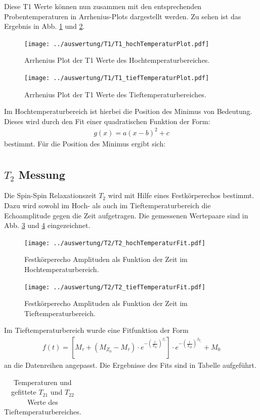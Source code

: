 Diese T1 Werte können nun zusammen mit den entsprechenden Probentemperaturen in Arrhenius-Plots dargestellt werden. Zu sehen ist das Ergebnis in Abb. \ref{pic_T1Arr_hoch} und \ref{pic_T1Arr_tief}.
\begin{figure}[htbp]
	\texttt{[image: ../auswertung/T1/T1\_hochTemperaturPlot.pdf]}
	\caption{Arrhenius Plot der T1 Werte des Hochtemperaturbereiches.}
	\label{pic_T1Arr_hoch}
\end{figure}
\begin{figure}[htbp]
	\texttt{[image: ../auswertung/T1/T1\_tiefTemperaturPlot.pdf]}
	\caption{Arrhenius Plot der T1 Werte des Tieftemperaturbereiches.}
	\label{pic_T1Arr_tief}
\end{figure}

Im Hochtemperaturbereich ist hierbei die Position des Minimus von Bedeutung. Dieses wird durch den Fit einer quadratischen Funktion der Form:
\begin{align}
	g(x) = a(x-b)^2+c
\end{align}
bestimmt. Für die Position des Minimus ergibt sich:
\begin{align*}
	
\end{align*}

\newpage
\subsection{$T_2$ Messung}
Die Spin-Spin Relaxationszeit $T_2$ wird mit Hilfe eines Festkörperechos bestimmt. Dazu wird sowohl im Hoch- als auch im Tieftemperaturbereich die Echoamplitude gegen die Zeit aufgetragen. Die gemessenen Wertepaare sind in Abb. \ref{pic_T2_hoch} und \ref{pic_T2_tief} eingezeichnet.
\begin{figure}[htbp]
	\texttt{[image: ../auswertung/T2/T2\_hochTemperaturFit.pdf]}
	\caption{Festkörperecho Amplituden als Funktion der Zeit im Hochtemperaturbereich.}
	\label{pic_T2_hoch}
\end{figure}
\begin{figure}[htbp]
	\texttt{[image: ../auswertung/T2/T2\_tiefTemperaturFit.pdf]}
	\caption{Festkörperecho Amplituden als Funktion der Zeit im Tieftemperaturbereich.}
	\label{pic_T2_tief}
\end{figure}

Im Tieftemperaturbereich wurde eine Fitfunktion der Form
\begin{align}
	f(t) = \left[ M_\tau+(M_{Z_0}-M_\tau)\cdot e^{-\left(\frac{t}{T_{21}}\right)^{\beta_\tau}} \right] \cdot e^{-\left(\frac{t}{T_{22}}\right)^{\beta_{T_1}}}+M_0
\end{align}
an die Datenreihen angepasst. Die Ergebnisse des Fits sind in Tabelle aufgeführt.
\begin{table}[htbp]
	\begin{tabular}{| >{$}c<{$} | >{$}c<{$} | >{$}c<{$} |>{$}c<{$} | >{$}c<{$} |}
		
	\end{tabular}
	\caption{Temperaturen und gefittete $T_{21}$ und $T_{22}$ Werte des Tieftemperaturbereiches.}
	\label{tab:T1_tief}
\end{table}


